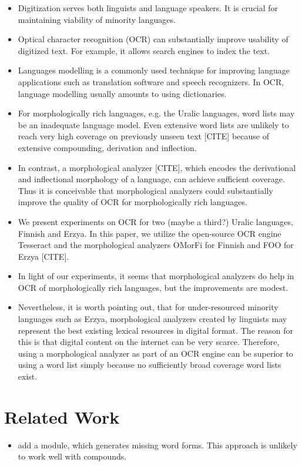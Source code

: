 \documentclass[b5paper]{article}
\begin{document}
\begin{itemize}
\item Digitization serves both linguists and language speakers. It is
  crucial for maintaining viability of minority languages.
\item Optical character recognition (OCR) can substantially improve
  usability of digitized text. For example, it allows search engines
  to index the text.
\item Languages modelling is a commonly used technique for improving
  language applications such as translation software and speech
  recognizers. In OCR, language modelling usually amounts to using
  dictionaries.
\item For morphologically rich languages, e.g. the Uralic languages,
  word lists may be an inadequate language model. Even extensive word
  lists are unlikely to reach very high coverage on previously
  unseen text [CITE] because of extensive compounding, derivation and
  inflection.
\item In contrast, a morphological analyzer [CITE], which encodes the
  derivational and inflectional morphology of a language, can achieve
  sufficient coverage. Thus it is conceivable that morphological
  analyzers could substantially improve the quality of OCR for
  morphologically rich languages.
\item We present experiments on OCR for two (maybe a third?) Uralic
  languages, Finnish and Erzya. In this paper, we utilize the
  open-source OCR engine Tesseract \cite{smith07} and the
  morphological analyzers OMorFi \cite{pirinen11} for Finnish and FOO
  for Erzya [CITE].
\item In light of our experiments, it seems that morphological
  analyzers do help in OCR of morphologically rich languages, but the
  improvements are modest.
\item Nevertheless, it is worth pointing out, that for under-resourced
  minority languages such as Erzya, morphological analyzers created by
  linguists may represent the best existing lexical resources in
  digital format. The reason for this is that digital content on the
  internet can be very scarce. Therefore, using a morphological
  analyzer as part of an OCR engine can be superior to using a word
  list simply because no sufficiently broad coverage word lists exist.
\end{itemize}

\section{Related Work}
\begin{itemize}
\item \cite{smith09} add a module, which generates missing word
  forms. This approach is unlikely to work well with compounds.

\end{itemize}
\end{document}
